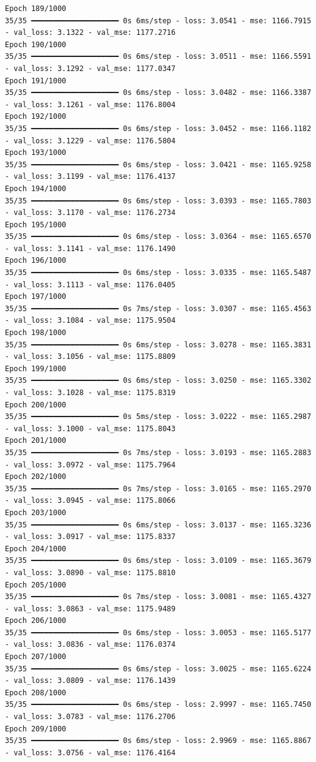 \documentclass[
  letterpaper,
  DIV=11,
  numbers=noendperiod]{scrreprt}
\begin{document}
\begin{verbatim}
Epoch 189/1000
35/35 ━━━━━━━━━━━━━━━━━━━━ 0s 6ms/step - loss: 3.0541 - mse: 1166.7915 - val_loss: 3.1322 - val_mse: 1177.2716
Epoch 190/1000
35/35 ━━━━━━━━━━━━━━━━━━━━ 0s 6ms/step - loss: 3.0511 - mse: 1166.5591 - val_loss: 3.1292 - val_mse: 1177.0347
Epoch 191/1000
35/35 ━━━━━━━━━━━━━━━━━━━━ 0s 6ms/step - loss: 3.0482 - mse: 1166.3387 - val_loss: 3.1261 - val_mse: 1176.8004
Epoch 192/1000
35/35 ━━━━━━━━━━━━━━━━━━━━ 0s 6ms/step - loss: 3.0452 - mse: 1166.1182 - val_loss: 3.1229 - val_mse: 1176.5804
Epoch 193/1000
35/35 ━━━━━━━━━━━━━━━━━━━━ 0s 6ms/step - loss: 3.0421 - mse: 1165.9258 - val_loss: 3.1199 - val_mse: 1176.4137
Epoch 194/1000
35/35 ━━━━━━━━━━━━━━━━━━━━ 0s 6ms/step - loss: 3.0393 - mse: 1165.7803 - val_loss: 3.1170 - val_mse: 1176.2734
Epoch 195/1000
35/35 ━━━━━━━━━━━━━━━━━━━━ 0s 6ms/step - loss: 3.0364 - mse: 1165.6570 - val_loss: 3.1141 - val_mse: 1176.1490
Epoch 196/1000
35/35 ━━━━━━━━━━━━━━━━━━━━ 0s 6ms/step - loss: 3.0335 - mse: 1165.5487 - val_loss: 3.1113 - val_mse: 1176.0405
Epoch 197/1000
35/35 ━━━━━━━━━━━━━━━━━━━━ 0s 7ms/step - loss: 3.0307 - mse: 1165.4563 - val_loss: 3.1084 - val_mse: 1175.9504
Epoch 198/1000
35/35 ━━━━━━━━━━━━━━━━━━━━ 0s 6ms/step - loss: 3.0278 - mse: 1165.3831 - val_loss: 3.1056 - val_mse: 1175.8809
Epoch 199/1000
35/35 ━━━━━━━━━━━━━━━━━━━━ 0s 6ms/step - loss: 3.0250 - mse: 1165.3302 - val_loss: 3.1028 - val_mse: 1175.8319
Epoch 200/1000
35/35 ━━━━━━━━━━━━━━━━━━━━ 0s 5ms/step - loss: 3.0222 - mse: 1165.2987 - val_loss: 3.1000 - val_mse: 1175.8043
Epoch 201/1000
35/35 ━━━━━━━━━━━━━━━━━━━━ 0s 7ms/step - loss: 3.0193 - mse: 1165.2883 - val_loss: 3.0972 - val_mse: 1175.7964
Epoch 202/1000
35/35 ━━━━━━━━━━━━━━━━━━━━ 0s 7ms/step - loss: 3.0165 - mse: 1165.2970 - val_loss: 3.0945 - val_mse: 1175.8066
Epoch 203/1000
35/35 ━━━━━━━━━━━━━━━━━━━━ 0s 6ms/step - loss: 3.0137 - mse: 1165.3236 - val_loss: 3.0917 - val_mse: 1175.8337
Epoch 204/1000
35/35 ━━━━━━━━━━━━━━━━━━━━ 0s 6ms/step - loss: 3.0109 - mse: 1165.3679 - val_loss: 3.0890 - val_mse: 1175.8810
Epoch 205/1000
35/35 ━━━━━━━━━━━━━━━━━━━━ 0s 7ms/step - loss: 3.0081 - mse: 1165.4327 - val_loss: 3.0863 - val_mse: 1175.9489
Epoch 206/1000
35/35 ━━━━━━━━━━━━━━━━━━━━ 0s 6ms/step - loss: 3.0053 - mse: 1165.5177 - val_loss: 3.0836 - val_mse: 1176.0374
Epoch 207/1000
35/35 ━━━━━━━━━━━━━━━━━━━━ 0s 6ms/step - loss: 3.0025 - mse: 1165.6224 - val_loss: 3.0809 - val_mse: 1176.1439
Epoch 208/1000
35/35 ━━━━━━━━━━━━━━━━━━━━ 0s 6ms/step - loss: 2.9997 - mse: 1165.7450 - val_loss: 3.0783 - val_mse: 1176.2706
Epoch 209/1000
35/35 ━━━━━━━━━━━━━━━━━━━━ 0s 6ms/step - loss: 2.9969 - mse: 1165.8867 - val_loss: 3.0756 - val_mse: 1176.4164

\end{verbatim}
\end{document}
